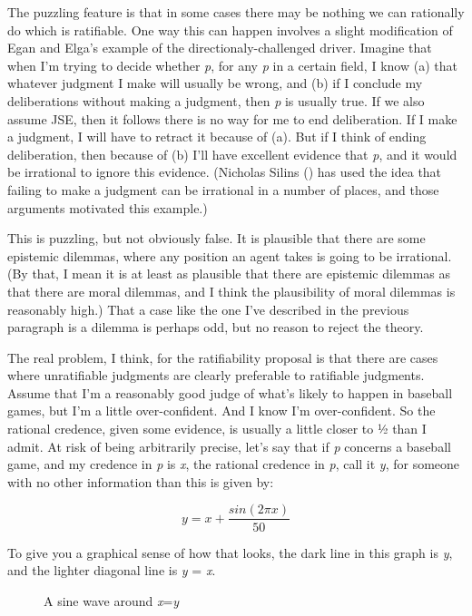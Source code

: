 \documentclass[
  11pt,
  letterpaper,
  DIV=11,
  numbers=noendperiod,
  twoside]{scrartcl}
\makeatletter
\newcommand*\pandocbounded[1]{%
  \sbox\pandoc@box{#1}%
  \Gscale@div\@tempa{\textheight}{\dimexpr\ht\pandoc@box+\dp\pandoc@box\relax}%
  \Gscale@div\@tempb{\linewidth}{\wd\pandoc@box}%
  \ifdim\@tempb\p@<\@tempa\p@\let\@tempa\@tempb\fi%
  \ifdim\@tempa\p@<\p@\scalebox{\@tempa}{\usebox\pandoc@box}%
  \else\usebox{\pandoc@box}%
  \fi%
}
\makeatother
\begin{document}
The puzzling feature is that in some cases there may be nothing we can
rationally do which is ratifiable. One way this can happen involves a
slight modification of Egan and Elga's example of the
directionaly-challenged driver. Imagine that when I'm trying to decide
whether \emph{p}, for any \emph{p} in a certain field, I know (a) that
whatever judgment I make will usually be wrong, and (b) if I conclude my
deliberations without making a judgment, then \emph{p} is usually true.
If we also assume JSE, then it follows there is no way for me to end
deliberation. If I make a judgment, I will have to retract it because of
(a). But if I think of ending deliberation, then because of (b) I'll
have excellent evidence that \emph{p}, and it would be irrational to
ignore this evidence. (Nicholas Silins ()
has used the idea that failing to make a judgment can be irrational in a
number of places, and those arguments motivated this example.)

This is puzzling, but not obviously false. It is plausible that there
are some epistemic dilemmas, where any position an agent takes is going
to be irrational. (By that, I mean it is at least as plausible that
there are epistemic dilemmas as that there are moral dilemmas, and I
think the plausibility of moral dilemmas is reasonably high.) That a
case like the one I've described in the previous paragraph is a dilemma
is perhaps odd, but no reason to reject the theory.

The real problem, I think, for the ratifiability proposal is that there
are cases where unratifiable judgments are clearly preferable to
ratifiable judgments. Assume that I'm a reasonably good judge of what's
likely to happen in baseball games, but I'm a little over-confident. And
I know I'm over-confident. So the rational credence, given some
evidence, is usually a little closer to ½ than I admit. At risk of being
arbitrarily precise, let's say that if \emph{p} concerns a baseball
game, and my credence in \emph{p} is \emph{x}, the rational credence in
\emph{p}, call it \emph{y}, for someone with no other information than
this is given by:

\[
y = x + \frac{sin(2\pi x)}{50}
\]

To give you a graphical sense of how that looks, the dark line in this
graph is \emph{y}, and the lighter diagonal line is \emph{y} = \emph{x}.

\begin{figure}[H]

{\centering \pandocbounded{\texttt{[image: sinewave.JPG]}}

}

\caption{A sine wave around \emph{x}=\emph{y}}

\end{figure}%
\end{document}
